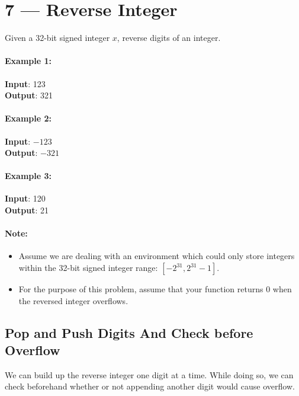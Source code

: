 \section{7 --- Reverse Integer}
Given a 32-bit signed integer $x$, reverse digits of an integer.

\paragraph{Example 1:}

\begin{flushleft}
	\textbf{Input}: 123
	\\
\textbf{Output}: 321
\end{flushleft}

\paragraph{Example 2:}

\begin{flushleft}
	\textbf{Input}: $-123$
	\\
\textbf{Output}: $-321$
\end{flushleft}

\paragraph{Example 3:}

\begin{flushleft}
	\textbf{Input}: 120
	\\
\textbf{Output}: 21
\end{flushleft}

\paragraph{Note:}
\begin{itemize}
	\item Assume we are dealing with an environment which could only store integers within the 32-bit signed integer range: $[−2^{31},  2^{31} − 1]$. 
	\item For the purpose of this problem, assume that your function returns 0 when the reversed integer overflows.
\end{itemize}

\subsection{Pop and Push Digits And Check before Overflow}
We can build up the reverse integer one digit at a time. While doing so, we can check beforehand whether or not appending another digit would cause overflow.


